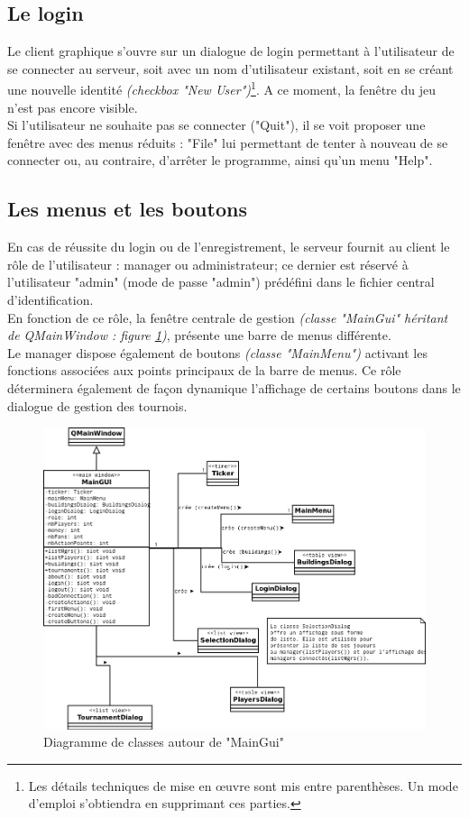\documentclass[a4paper,titlepage]{scrreprt}
\begin{document}
\subsection{Le login}
Le client graphique s'ouvre sur un dialogue de login permettant à l'utilisateur de se connecter au serveur,
soit avec un nom d'utilisateur existant, soit en se créant une nouvelle identité \emph{(checkbox "New User")}\footnote{Les détails techniques de mise en \oe uvre sont mis entre parenthèses.
Un mode d'emploi s'obtiendra en supprimant ces parties.}.
A ce moment, la fenêtre du jeu n'est pas encore visible.\\
Si l'utilisateur ne souhaite pas se connecter ("Quit"), il se voit proposer une fenêtre avec
des menus réduits : "File" lui permettant de tenter à nouveau de se connecter ou, au contraire,
d'arrêter le programme, ainsi qu'un menu "Help".

\subsection{Les menus et les boutons}
En cas de réussite du login ou de l'enregistrement, le serveur fournit au client le rôle
de l'utilisateur : manager ou administrateur; ce dernier est réservé à l'utilisateur
"admin" (mode de passe "admin") prédéfini dans le fichier central d'identification.\\
En fonction de ce rôle, la fenêtre centrale de gestion \emph{(classe "MainGui" héritant de QMainWindow
: figure \ref{mainGUI})},
présente une barre de menus différente.\\
Le manager dispose également de boutons
\emph{(classe "MainMenu")} activant les fonctions associées aux points principaux de la barre de menus.
Ce rôle déterminera également de façon dynamique l'affichage de certains boutons dans le dialogue
de gestion des tournois.
    \begin{figure}[H]
    \center
    \includegraphics[scale=0.4]{uml/class/mainGUI.png}
    \caption{Diagramme de classes autour de "MainGui"} \label{mainGUI}
    \end{figure}
\end{document}
